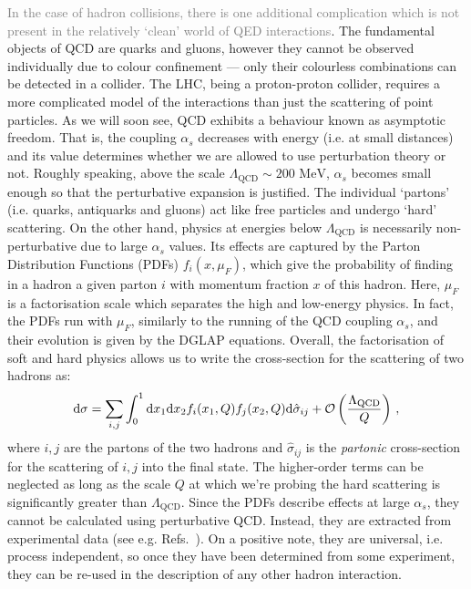 \documentclass[main.tex]{subfiles}
\begin{document}
\textcolor{gray}{In the case of hadron collisions, there is one additional complication which is not present in the relatively `clean' world of QED interactions}.  The fundamental objects of QCD are quarks and gluons, however they cannot be observed individually due to colour confinement --- only their colourless combinations can be detected in a collider. The LHC, being a proton-proton collider, requires a more complicated model of the interactions than just the scattering of point particles. As we will soon see, QCD exhibits a behaviour known as asymptotic freedom. That is, the coupling $\alpha_s$ decreases with energy (i.e. at small distances) and its value determines whether we are allowed to use perturbation theory or not. Roughly speaking, above the scale $\Lambda_\text{QCD} \sim 200 \text{ MeV}$, $\alpha_s$ becomes small enough so that the perturbative expansion is justified. The individual `partons' (i.e. quarks, antiquarks and gluons) act like free particles and undergo `hard' scattering\cite{PhysRevLett.23.1415}. On the other hand, physics at energies below $\Lambda_\text{QCD}$ is necessarily non-perturbative due to large $\alpha_s$ values. Its effects are captured by the Parton Distribution Functions (PDFs) $f_i(x, \mu_F)$, which give the probability of finding in a hadron a given parton $i$ with momentum fraction $x$ of this hadron. Here, $\mu_F$ is a factorisation scale which separates the high and low-energy physics. In fact, the PDFs run with $\mu_F$, similarly to the running of the QCD coupling $\alpha_s$, and their evolution is given by the DGLAP equations.
Overall, the factorisation of soft and hard physics allows us to write the cross-section for the scattering of two hadrons as:
\begin{equation} \label{eq:factorisation}
    \mathrm{d} \sigma = \sum_{i,j} \int_0^1 \mathrm{d} x_1 \mathrm{d} x_2 f_i(x_1, Q) f_j(x_2, Q) \mathrm{d} \hat{\sigma}_{ij} + \mathcal{O}\left(\frac{\Lambda_\text{QCD}}{Q}\right)\,,
\end{equation}
where $i, j$ are the partons of the two hadrons and $\hat{\sigma}_{ij}$ is the \textit{partonic} cross-section for the scattering of $i,j$ into the final state. The higher-order terms can be neglected as long as the scale $Q$ at which we're probing the hard scattering is significantly greater than $\Lambda_{\text{QCD}}$. Since the PDFs describe effects at large $\alpha_s$, they cannot be calculated using perturbative QCD. Instead, they are extracted from experimental data (see e.g. Refs.~\cite{H1:2015ubc, Alekhin:2017kpj, Hou:2019efy, NNPDF:2021uiq, Buckley:2014ana}). On a positive note, they are universal, i.e. process independent, so once they have been determined from some experiment, they can be re-used in the description of any other hadron interaction. 
\end{document}
